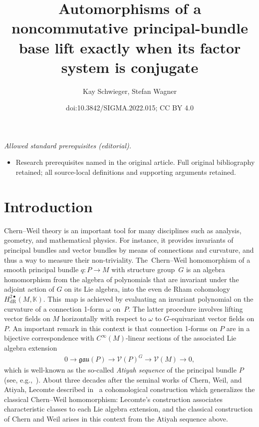 \documentclass[10pt,a4paper]{amsart}
\title{Automorphisms of a noncommutative principal-bundle base lift exactly when its factor system is conjugate}
\author{Kay Schwieger, Stefan Wagner}
\date{doi:10.3842/SIGMA.2022.015; CC BY 4.0}
\numberwithin{equation}{section}
\begin{document}
\maketitle
\noindent\textit{Allowed standard prerequisites (editorial).}\begin{itemize}
\item Research prerequisites named in the original article. Full original bibliography retained; all source-local definitions and supporting arguments retained.
\end{itemize}\medskip
\section{Introduction}\label{sec:intro}
	
Chern--Weil theory is an important tool for many disciplines such as analysis, geometry, and mathematical physics.
For instance, it provides invariants of principal bundles and vector bundles by means of connections and curvature, and thus a way to measure their non-triviality. The~Chern--Weil homomorphism of a smooth principal bundle $q\colon P \to M$ with structure group~$G$ is an algebra homomorphism from the algebra of polynomials that are invariant under the adjoint action of $G$ on its Lie algebra, into the even de Rham cohomology $H_{\text{dR}}^{2\bullet}(M,\mathbb{K})$.
This~map is achieved by evaluating an invariant polynomial on the curvature of a connection 1-form $\omega$ on~$P$.
The latter procedure involves lifting vector fields on $M$ horizontally with respect to $\omega$ to $G$-equivariant vector fields on $P$.
An important remark in this context is that connection 1-forms on $P$ are in a bijective correspondence with $C^{\infty}(M)$-linear sections of the associated Lie algebra extension
\begin{gather}
	0 \longrightarrow \mathfrak{gau}(P)\longrightarrow \mathcal{V}(P)^G\longrightarrow \mathcal{V}(M) \longrightarrow 0, \label{eq:Atiyah}
\end{gather}
which is well-known as the so-called \emph{Atiyah sequence} of the principal bundle $P$ (see, e.g.,~\cite{Ati57,Kob69II}).
About three decades after the seminal works of Chern, Weil, and Atiyah, Lecomte described in~\cite{Lec85} a cohomological construction which generalizes the classical Chern--Weil homomorphism: Lecomte's construction associates characteristic classes to each Lie algebra extension, and the classical construction of Chern and Weil arises in this context from the Atiyah sequence above.
\end{document}
